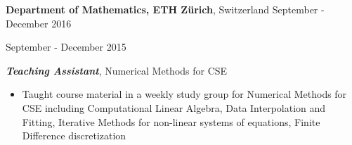
\vspace{7pt}

\textbf{Department of Mathematics, ETH Zürich}, Switzerland \hfill September - December 2016

\hfill September - December 2015


\textbf{\textit{Teaching Assistant}}, Numerical Methods for CSE

\begin{itemize}
    \item Taught course material in a weekly study group for Numerical Methods for CSE including Computational Linear Algebra, Data Interpolation and Fitting, Iterative Methods for non-linear systems of equations, Finite Difference discretization
\end{itemize}
